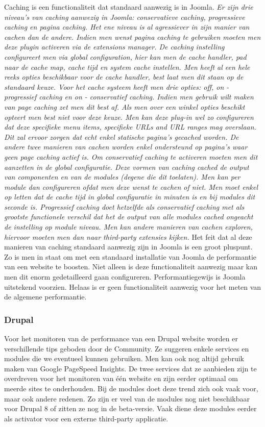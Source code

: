 Caching is een functionaliteit dat standaard aanwezig is in Joomla. \textit{Er zijn drie niveau's van caching aanwezig in Joomla: conservatieve caching, progressieve caching en pagina caching. Het ene niveau is al agressiever in zijn manier van cachen dan de andere. Indien men wenst pagina caching te gebruiken moeten men deze plugin activeren via de extensions manager. De caching instelling configureert men via global configuration, hier kan men de cache handler, pad naar de cache map, cache tijd en system cache instellen. Men heeft al een hele reeks opties beschikbaar voor de cache handler, best laat men dit staan op de standaard keuze. Voor het cache systeem heeft men drie opties: off, on - progressief caching en on - conservatief caching. Indien men gebruik wilt maken van page caching zet men dit best af. Als men over een winkel opties beschikt opteert men best niet voor deze keuze. Men kan deze plug-in wel zo configureren dat deze specifieke menu items, specifieke URLs and URL ranges mag overslaan. Dit zal ervoor zorgen dat echt enkel statische pagina's gecached worden. De andere twee manieren van cachen worden enkel ondersteund op pagina's waar geen page caching actief is. Om conservatief caching te activeren moeten men dit aanzetten in de global configuratie. Deze vormen van caching cached de output van componenten en van de modules (degene die dit toelaten). Men kan per module dan configureren ofdat men deze wenst te cachen of niet. Men moet enkel op letten dat de cache tijd in global configuratie in minuten is en bij modules dit seconde is. Progressief caching doet hetzelfde als conservatief caching met als grootste functionele verschil dat het de output van alle modules cached ongeacht de instelling op module niveau. Men kan andere manieren van cachen exploren, hiervoor moeten men dan naar third-party extensies kijken.}\autocite{JoomlaCommunity2019d} Het feit dat al deze manieren van caching standaard aanwezig zijn in Joomla is een groot pluspunt. Zo is men in staat om met een standaard installatie van Joomla de performantie van een website te boosten. Niet alleen is deze functionaliteit aanwezig maar kan men dit enorm gedetailleerd gaan configureren. Performantiegewijs is Joomla uitstekend voorzien. Helaas is er geen functionaliteit aanwezig voor het meten van de algemene performantie.
\subsubsection{Drupal}
Voor het monitoren van de performance van een Drupal website worden er verschillende tips geboden door de Community. Ze suggeren enkele services en modules die we eventueel kunnen gebruiken. Men kan ook nog altijd gebruik maken van Google PageSpeed Insights. De twee services dat ze aanbieden zijn te overdreven voor het monitoren van één website en zijn eerder optimaal om meerde sites te onderhouden. Bij de modules doet deze trend zich ook vaak voor, maar ook andere redenen. Zo zijn er veel van de modules nog niet beschikbaar voor Drupal 8 of zitten ze nog in de beta-versie. Vaak diene deze modules eerder als activator voor een externe third-party applicatie. 

